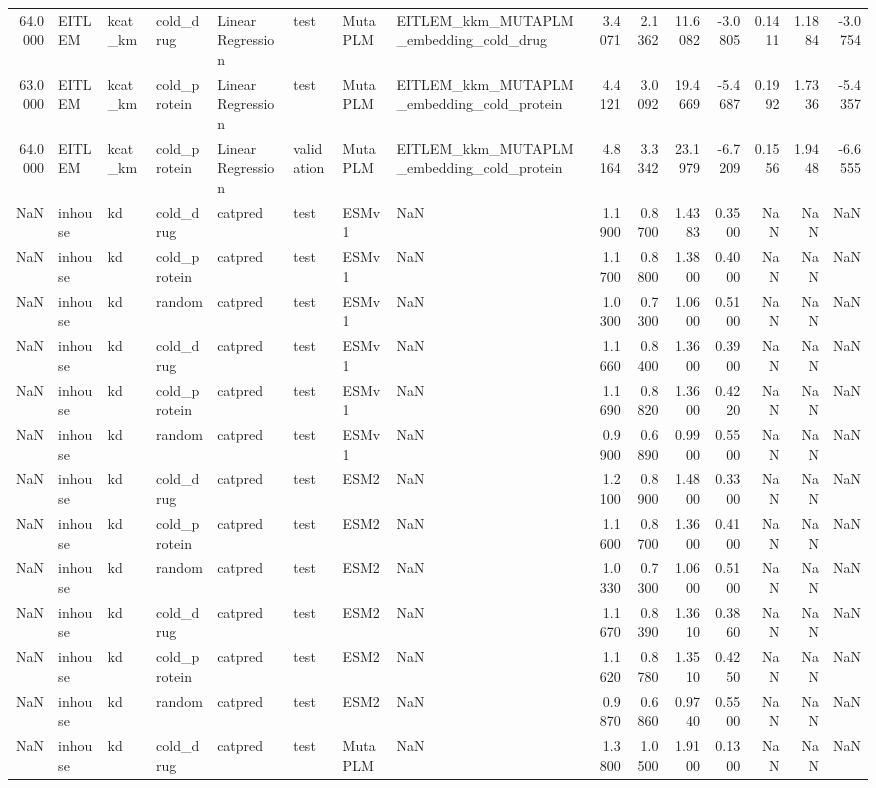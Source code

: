 \begin{tabular}{rlllllllrrrrrrr}
64.0000 & EITLEM & kcat_km & cold_drug & Linear Regression & test & MutaPLM & EITLEM_kkm_MUTAPLM_embedding_cold_drug & 3.4071 & 2.1362 & 11.6082 & -3.0805 & 0.1411 & 1.1884 & -3.0754 \\
63.0000 & EITLEM & kcat_km & cold_protein & Linear Regression & test & MutaPLM & EITLEM_kkm_MUTAPLM_embedding_cold_protein & 4.4121 & 3.0092 & 19.4669 & -5.4687 & 0.1992 & 1.7336 & -5.4357 \\
64.0000 & EITLEM & kcat_km & cold_protein & Linear Regression & validation & MutaPLM & EITLEM_kkm_MUTAPLM_embedding_cold_protein & 4.8164 & 3.3342 & 23.1979 & -6.7209 & 0.1556 & 1.9448 & -6.6555 \\
NaN & inhouse & kd & cold_drug & catpred & test & ESMv1 & NaN & 1.1900 & 0.8700 & 1.4383 & 0.3500 & NaN & NaN & NaN \\
NaN & inhouse & kd & cold_protein & catpred & test & ESMv1 & NaN & 1.1700 & 0.8800 & 1.3800 & 0.4000 & NaN & NaN & NaN \\
NaN & inhouse & kd & random & catpred & test & ESMv1 & NaN & 1.0300 & 0.7300 & 1.0600 & 0.5100 & NaN & NaN & NaN \\
NaN & inhouse & kd & cold_drug & catpred & test & ESMv1 & NaN & 1.1660 & 0.8400 & 1.3600 & 0.3900 & NaN & NaN & NaN \\
NaN & inhouse & kd & cold_protein & catpred & test & ESMv1 & NaN & 1.1690 & 0.8820 & 1.3600 & 0.4220 & NaN & NaN & NaN \\
NaN & inhouse & kd & random & catpred & test & ESMv1 & NaN & 0.9900 & 0.6890 & 0.9900 & 0.5500 & NaN & NaN & NaN \\
NaN & inhouse & kd & cold_drug & catpred & test & ESM2 & NaN & 1.2100 & 0.8900 & 1.4800 & 0.3300 & NaN & NaN & NaN \\
NaN & inhouse & kd & cold_protein & catpred & test & ESM2 & NaN & 1.1600 & 0.8700 & 1.3600 & 0.4100 & NaN & NaN & NaN \\
NaN & inhouse & kd & random & catpred & test & ESM2 & NaN & 1.0330 & 0.7300 & 1.0600 & 0.5100 & NaN & NaN & NaN \\
NaN & inhouse & kd & cold_drug & catpred & test & ESM2 & NaN & 1.1670 & 0.8390 & 1.3610 & 0.3860 & NaN & NaN & NaN \\
NaN & inhouse & kd & cold_protein & catpred & test & ESM2 & NaN & 1.1620 & 0.8780 & 1.3510 & 0.4250 & NaN & NaN & NaN \\
NaN & inhouse & kd & random & catpred & test & ESM2 & NaN & 0.9870 & 0.6860 & 0.9740 & 0.5500 & NaN & NaN & NaN \\
NaN & inhouse & kd & cold_drug & catpred & test & MutaPLM & NaN & 1.3800 & 1.0500 & 1.9100 & 0.1300 & NaN & NaN & NaN \\

\end{tabular}
